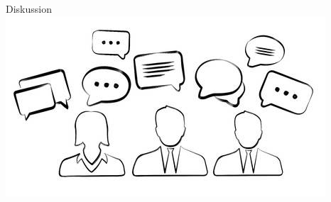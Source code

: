 \documentclass[aspectratio=1610,12pt]{beamer}
\begin{document}
\begin{frame}{Diskussion}
  \centering
  \vspace{-0.5cm}
  \includegraphics[width=\textwidth]{img/discussion.png}
\end{frame}
\end{document}
